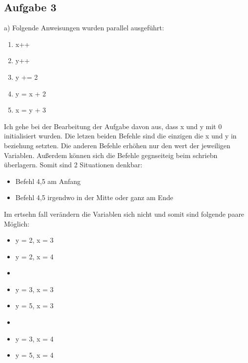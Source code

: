 \subsection*{Aufgabe 3}

a) Folgende Anweisungen wurden parallel ausgeführt: 

\begin{enumerate} 
  \item x++
  \item y++
  \item y += 2
  \item y = x + 2
  \item x = y + 3
\end{enumerate}

Ich gehe bei der Bearbeitung der Aufgabe davon aus, dass x und y mit 0 initialisiert wurden. 
Die letzen beiden Befehle  sind die einzigen die x und y in beziehung setzten. Die anderen Befehle erhöhen nur den wert der jeweiligen Variablen. Außerdem können sich die Befehle gegnseiteig beim schriebn überlagern. Somit sind 2 Situationen denkbar:
\begin{itemize}
  \item Befehl 4,5 am Anfang
  \item Befehl 4,5 irgendwo in der Mitte oder ganz am Ende 
\end{itemize}

Im ertsehn fall verändern die Variablen sich nicht und somit sind folgende paare Möglich:
\begin{itemize}

	\item[] y = 2, x = 3
	\item[] y = 2, x = 4
	\item[]

	\item[] y = 3, x = 3
	\item[] y = 5, x = 3
	\item[]

	\item[] y = 3, x = 4
	\item[] y = 5, x = 4
\end{itemize}


